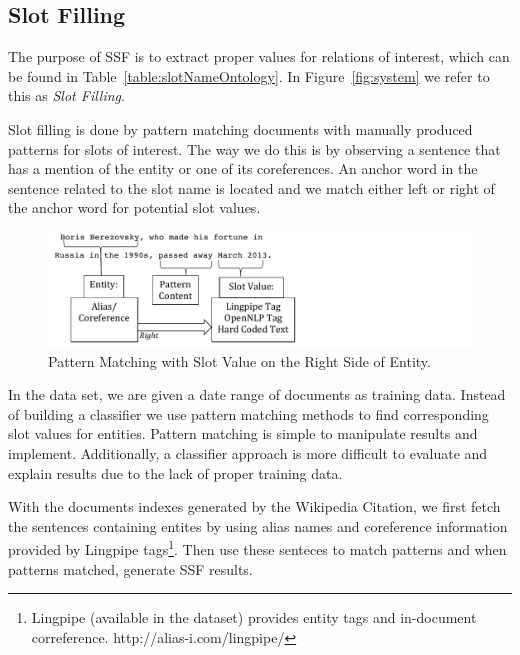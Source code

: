 \subsection{Slot Filling}
The purpose of SSF is to extract proper values for relations of interest, which can be found in Table~\ref{table:slotNameOntology}.  In Figure~\ref{fig:system} we refer to this as \textit{Slot Filling}. 

Slot filling is done by pattern matching documents with manually produced patterns for slots of interest. The way we do this is by observing a sentence that has a mention of the entity or one of its coreferences. An anchor word in the sentence related to the slot name is located and we match either left or right of the anchor word for potential slot values. 


\begin{figure}
\centering
\includegraphics[width = 13cm]{./images/Pattern-crop.pdf}
\vspace*{-.1in} \caption{Pattern Matching with Slot Value on the Right Side of Entity. }\label{fig:pattern}
\vspace*{-.2in}
\end{figure}

In the data set, we are given a date range of documents as training data. Instead of building a classifier we use pattern matching methods to find corresponding slot values for entities. 
Pattern matching is simple to manipulate results and implement. Additionally, a classifier approach is more difficult to evaluate and explain results due to the lack of proper training data.

With the documents indexes generated by the Wikipedia Citation, we first fetch the sentences containing entites by using alias names and coreference information provided by Lingpipe tags\footnote{Lingpipe (available in the dataset) provides entity tags and in-document correference. http://alias-i.com/lingpipe/}. Then use these senteces to match patterns and when patterns matched, generate SSF results.

